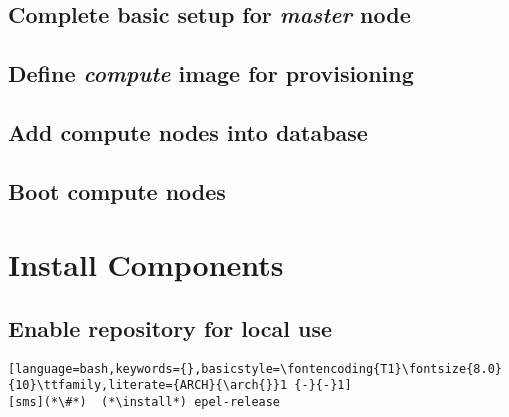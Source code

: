 \documentclass[letterpaper]{article}
\newcommand{\arch}{x86\_64}
\newcommand{\install}{dnf -y install}
\begin{document}
\vspace*{-0.15cm}
\subsection{Complete basic \Confluent{} setup for {\em master} node} \label{sec:setup_confluent}


\subsection{Define {\em compute} image for provisioning}


\vspace*{0.9cm}
\subsection{Add compute nodes into \Confluent{} database} \label{sec:confluent_add_nodes}


\subsection{Boot compute nodes} \label{sec:boot_computes}


\section{Install \OHPC{} Components} \label{sec:basic_install}


\subsection{Enable \OHPC{} repository for local use} \label{sec:enable_repo}






\begin{lstlisting}[language=bash,keywords={},basicstyle=\fontencoding{T1}\fontsize{8.0}{10}\ttfamily,literate={ARCH}{\arch{}}1 {-}{-}1]
[sms](*\#*)  (*\install*) epel-release
\end{lstlisting}
\end{document}
